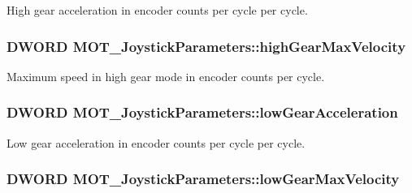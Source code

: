 High gear acceleration in encoder counts per cycle per cycle. 

\subsubsection[{\texorpdfstring{high\+Gear\+Max\+Velocity}{highGearMaxVelocity}}]{\setlength{\rightskip}{0pt plus 5cm}D\+W\+O\+RD M\+O\+T\+\_\+\+Joystick\+Parameters\+::high\+Gear\+Max\+Velocity}\hypertarget{struct_m_o_t___joystick_parameters_ad51990e3ea03f8103ad1e5d72c4a5a71}{}\label{struct_m_o_t___joystick_parameters_ad51990e3ea03f8103ad1e5d72c4a5a71}


Maximum speed in high gear mode in encoder counts per cycle. 

\subsubsection[{\texorpdfstring{low\+Gear\+Acceleration}{lowGearAcceleration}}]{\setlength{\rightskip}{0pt plus 5cm}D\+W\+O\+RD M\+O\+T\+\_\+\+Joystick\+Parameters\+::low\+Gear\+Acceleration}\hypertarget{struct_m_o_t___joystick_parameters_a489c5768d30741a268d6bf31e8cb6404}{}\label{struct_m_o_t___joystick_parameters_a489c5768d30741a268d6bf31e8cb6404}


Low gear acceleration in encoder counts per cycle per cycle. 

\subsubsection[{\texorpdfstring{low\+Gear\+Max\+Velocity}{lowGearMaxVelocity}}]{\setlength{\rightskip}{0pt plus 5cm}D\+W\+O\+RD M\+O\+T\+\_\+\+Joystick\+Parameters\+::low\+Gear\+Max\+Velocity}\hypertarget{struct_m_o_t___joystick_parameters_af1a11840ffd6d87d94517b5f37fbb753}{}\label{struct_m_o_t___joystick_parameters_af1a11840ffd6d87d94517b5f37fbb753}


